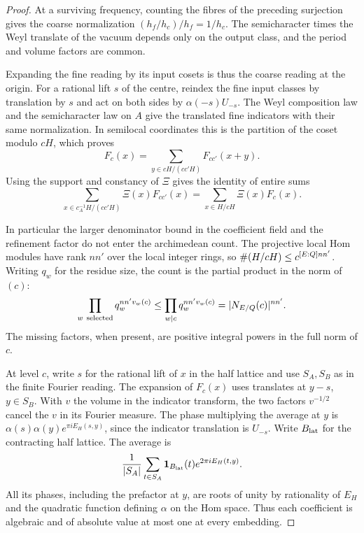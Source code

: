 \begin{proof}
At a surviving frequency, counting the fibres of the preceding
surjection gives the coarse normalization \((h_f/h_c)/h_f=1/h_c\).
The semicharacter times the Weyl
translate of the vacuum depends only on the output class,
and the period and volume factors are common.

Expanding the fine reading by its input cosets is thus the
coarse reading at the origin. For a rational lift \(s\) of
the centre, reindex the fine input classes by translation
by \(s\) and act on both sides by \(\alpha(-s)U_{-s}\).
The Weyl composition law and the semicharacter law on \(A\)
give the translated fine indicators with
their same normalization. In semilocal coordinates this is
the partition of the coset modulo \(cH\), which proves
\[
 F_c(x)=\sum_{y\in cH/(cc'H)}F_{cc'}(x+y).
\]
Using the support and constancy of \(\Xi\) gives the
identity of entire sums
\begin{equation}\label{eq:selected-kernel-regroup}
 \sum_{x\in c_A^{-1}H/(cc'H)}\Xi(x) F_{cc'}(x)
        =\sum_{x\in H/cH}\Xi(x) F_c(x).
\end{equation}

In particular the larger denominator bound in the
coefficient field and the refinement factor do not
enter the archimedean count. The projective local
Hom modules have rank \(nn'\) over the local integer
rings, so
\(\#(H/cH)\le c^{[E:Q]nn'}\). Writing \(q_w\) for the residue size, the count is the partial
product in the norm of \((c)\):
\[
 \prod_{w\ {\rm selected}}q_w^{nn' v_w(c)}
   \le\prod_{w\mid c}q_w^{nn' v_w(c)}
   = |N_{E/Q}(c)|^{nn'} .
\] The missing factors, when present,
are positive integral powers in the full norm of \(c\).

At level \(c\), write \(s\) for the rational lift of \(x\)
in the half lattice and use \(S_A,S_B\) as in the
finite Fourier reading. The expansion of \(F_c(x)\)
uses translates at \(y-s\), \(y\in S_B\). With \(v\) the
volume in the indicator transform, the two factors
\(v^{-1/2}\) cancel the \(v\) in its Fourier measure.
The phase multiplying the average at \(y\) is
\(\alpha(s)\alpha(y)e^{\pi i E_H(s,y)}\), since the
indicator translation is \(U_{-s}\). Write \(B_{\rm lat}\)
for the contracting half lattice. The average is
\[
 \frac1{|S_A|}\sum_{t\in S_A}{\bf1}_{B_{\rm lat}}(t)
                                e^{2\pi i E_H(t,y)}.
\]
All its phases, including the prefactor at \(y\),
are roots of unity by rationality of \(E_H\) and the
quadratic function defining \(\alpha\) on the Hom space.
Thus each coefficient is algebraic and of absolute
value at most one at every embedding.


\end{proof}
